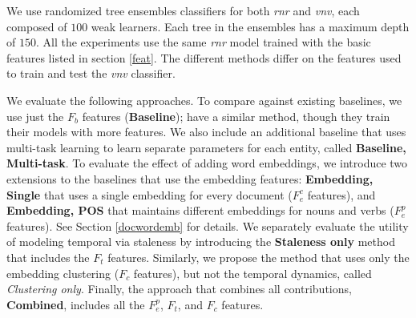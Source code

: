 \documentclass{article}
\begin{document}
We use randomized tree ensembles classifiers \cite{GEW06a} for both \emph{rnr} and \emph{vnv}, each composed of $100$ weak learners. Each tree in the ensembles has a maximum depth of $150$.
%
All the experiments use the same \emph{rnr} model trained with the basic features listed in section \ref{feat}.
The different methods differ on the features used to train and test the \emph{vnv} classifier.

We evaluate the following approaches.
  To compare against existing baselines, we use just the $F_b$ features ({\textbf{Baseline}}); \citet{jingang13, bellogin13} have a similar method, though they train their models with more features.
  We also include an additional baseline that uses multi-task learning \cite{Caruana93multitasklearning} to learn separate parameters for each entity, called {\textbf{Baseline, Multi-task}}.
  To evaluate the effect of adding word embeddings, we introduce two extensions to the baselines that use the embedding features: {\textbf{Embedding, Single}} that uses a single embedding for every document ($F_e^c$ features), and {\textbf{Embedding, POS}} that maintains different embeddings for nouns and verbs ($F_e^p$ features).
  See Section \ref{docwordemb} for details.
  We separately evaluate the utility of modeling temporal via staleness by introducing the {\textbf{Staleness only}} method that includes the $F_t$ features.
  Similarly, we propose the method that uses only the embedding clustering ($F_c$ features), but not the temporal dynamics, called {\textit{Clustering only}}.
  Finally, the approach that combines all contributions, {\textbf{Combined}}, includes all the $F_e^p$, $F_t$, and $F_c$ features.
\end{document}
